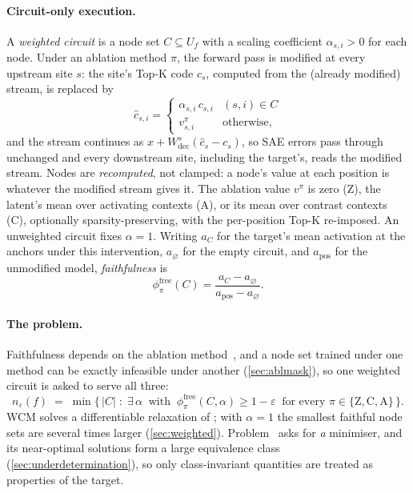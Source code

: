 \documentclass[10pt]{article}
\begin{document}
\paragraph{Circuit-only execution.}
A \emph{weighted circuit} is a node set $C \subseteq U_f$ with a scaling coefficient $\alpha_{s,i} > 0$ for each node.
Under an ablation method $\pi$, the forward pass is modified at every upstream site $s$: the site's Top-K code $c_s$, computed from the (already modified) stream, is replaced by
\[
    \hat{c}_{s,i} =
    \begin{cases}
        \alpha_{s,i}\, c_{s,i} & (s, i) \in C \\
        v^{\pi}_{s,i} & \text{otherwise,}
    \end{cases}
\]
and the stream continues as $x + W_{\mathrm{dec}}^{s}(\hat{c}_s - c_s)$, so SAE errors pass through unchanged and every downstream site, including the target's, reads the modified stream.
Nodes are \emph{recomputed}, not clamped: a node's value at each position is whatever the modified stream gives it.
The ablation value $v^{\pi}$ is zero (Z), the latent's mean over activating contexts (A), or its mean over contrast contexts (C), optionally sparsity-preserving, with the per-position Top-K re-imposed.
An unweighted circuit fixes $\alpha = 1$.
Writing $a_C$ for the target's mean activation at the anchors under this intervention, $a_{\varnothing}$ for the empty circuit, and $a_{\mathrm{pos}}$ for the unmodified model, \emph{faithfulness} is
\[
    \phi^{\mathrm{free}}_{\pi}(C) = \frac{a_C - a_{\varnothing}}{a_{\mathrm{pos}} - a_{\varnothing}}.
\]

\paragraph{The problem.}
Faithfulness depends on the ablation method~\citep{miller2024transformer, mueller2024missed}, and a node set trained under one method can be exactly infeasible under another (\cref{sec:ablmask}), so one weighted circuit is asked to serve all three:
\begin{equation}\tag{P}\label{eq:p2}
    n_{\varepsilon}(f)
    \;=\;
    \min \bigl\{\, |C| \;:\; \exists\, \alpha \ \text{ with } \ \phi^{\mathrm{free}}_{\pi}(C, \alpha) \geq 1 - \varepsilon \ \text{ for every } \pi \in \{\mathrm{Z}, \mathrm{C}, \mathrm{A}\} \,\bigr\}.
\end{equation}
WCM solves a differentiable relaxation of ; with $\alpha = 1$ the smallest faithful node sets are several times larger (\cref{sec:weighted}).
Problem~ asks for \emph{a} minimiser, and its near-optimal solutions form a large equivalence class (\cref{sec:underdetermination}), so only class-invariant quantities are treated as properties of the target.
\end{document}
